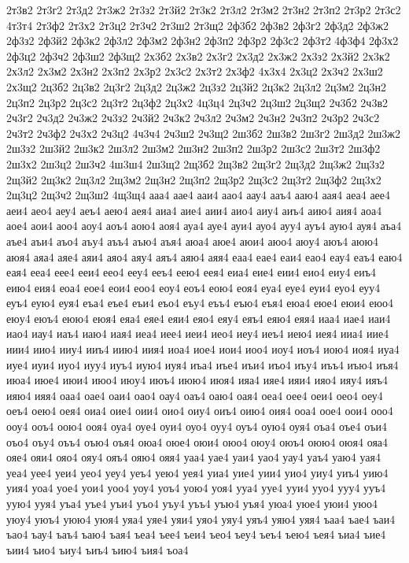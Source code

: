 {2т3в2
2т3г2
2т3д2
2т3ж2
2т3з2
2т3й2
2т3к2
2т3л2
2т3м2
2т3н2
2т3п2
2т3р2
2т3с2
4т3т4
2т3ф2
2т3х2
2т3ц2
2т3ч2
2т3ш2
2т3щ2
2ф3б2
2ф3в2
2ф3г2
2ф3д2
2ф3ж2
2ф3з2
2ф3й2
2ф3к2
2ф3л2
2ф3м2
2ф3н2
2ф3п2
2ф3р2
2ф3с2
2ф3т2
4ф3ф4
2ф3х2
2ф3ц2
2ф3ч2
2ф3ш2
2ф3щ2
2х3б2
2х3в2
2х3г2
2х3д2
2х3ж2
2х3з2
2х3й2
2х3к2
2х3л2
2х3м2
2х3н2
2х3п2
2х3р2
2х3с2
2х3т2
2х3ф2
4х3х4
2х3ц2
2х3ч2
2х3ш2
2х3щ2
2ц3б2
2ц3в2
2ц3г2
2ц3д2
2ц3ж2
2ц3з2
2ц3й2
2ц3к2
2ц3л2
2ц3м2
2ц3н2
2ц3п2
2ц3р2
2ц3с2
2ц3т2
2ц3ф2
2ц3х2
4ц3ц4
2ц3ч2
2ц3ш2
2ц3щ2
2ч3б2
2ч3в2
2ч3г2
2ч3д2
2ч3ж2
2ч3з2
2ч3й2
2ч3к2
2ч3л2
2ч3м2
2ч3н2
2ч3п2
2ч3р2
2ч3с2
2ч3т2
2ч3ф2
2ч3х2
2ч3ц2
4ч3ч4
2ч3ш2
2ч3щ2
2ш3б2
2ш3в2
2ш3г2
2ш3д2
2ш3ж2
2ш3з2
2ш3й2
2ш3к2
2ш3л2
2ш3м2
2ш3н2
2ш3п2
2ш3р2
2ш3с2
2ш3т2
2ш3ф2
2ш3х2
2ш3ц2
2ш3ч2
4ш3ш4
2ш3щ2
2щ3б2
2щ3в2
2щ3г2
2щ3д2
2щ3ж2
2щ3з2
2щ3й2
2щ3к2
2щ3л2
2щ3м2
2щ3н2
2щ3п2
2щ3р2
2щ3с2
2щ3т2
2щ3ф2
2щ3х2
2щ3ц2
2щ3ч2
2щ3ш2
4щ3щ4
ааа4
аае4
ааи4
аао4
аау4
ааъ4
ааю4
аая4
аеа4
аее4
аеи4
аео4
аеу4
аеъ4
аею4
аея4
аиа4
аие4
аии4
аио4
аиу4
аиъ4
аию4
аия4
аоа4
аое4
аои4
аоо4
аоу4
аоъ4
аою4
аоя4
ауа4
ауе4
ауи4
ауо4
ауу4
ауъ4
аую4
ауя4
аъа4
аъе4
аъи4
аъо4
аъу4
аъъ4
аъю4
аъя4
аюа4
аюе4
аюи4
аюо4
аюу4
аюъ4
аюю4
аюя4
аяа4
аяе4
аяи4
аяо4
аяу4
аяъ4
аяю4
аяя4
еаа4
еае4
еаи4
еао4
еау4
еаъ4
еаю4
еая4
ееа4
еее4
ееи4
еео4
ееу4
ееъ4
еею4
еея4
еиа4
еие4
еии4
еио4
еиу4
еиъ4
еию4
еия4
еоа4
еое4
еои4
еоо4
еоу4
еоъ4
еою4
еоя4
еуа4
еуе4
еуи4
еуо4
еуу4
еуъ4
еую4
еуя4
еъа4
еъе4
еъи4
еъо4
еъу4
еъъ4
еъю4
еъя4
еюа4
еюе4
еюи4
еюо4
еюу4
еюъ4
еюю4
еюя4
еяа4
еяе4
еяи4
еяо4
еяу4
еяъ4
еяю4
еяя4
иаа4
иае4
иаи4
иао4
иау4
иаъ4
иаю4
иая4
иеа4
иее4
иеи4
иео4
иеу4
иеъ4
иею4
иея4
ииа4
иие4
иии4
иио4
ииу4
ииъ4
иию4
иия4
иоа4
иое4
иои4
иоо4
иоу4
иоъ4
иою4
иоя4
иуа4
иуе4
иуи4
иуо4
иуу4
иуъ4
иую4
иуя4
иъа4
иъе4
иъи4
иъо4
иъу4
иъъ4
иъю4
иъя4
июа4
июе4
июи4
июо4
июу4
июъ4
июю4
июя4
ияа4
ияе4
ияи4
ияо4
ияу4
ияъ4
ияю4
ияя4
оаа4
оае4
оаи4
оао4
оау4
оаъ4
оаю4
оая4
оеа4
оее4
оеи4
оео4
оеу4
оеъ4
оею4
оея4
оиа4
оие4
оии4
оио4
оиу4
оиъ4
оию4
оия4
ооа4
оое4
оои4
ооо4
ооу4
ооъ4
оою4
ооя4
оуа4
оуе4
оуи4
оуо4
оуу4
оуъ4
оую4
оуя4
оъа4
оъе4
оъи4
оъо4
оъу4
оъъ4
оъю4
оъя4
оюа4
оюе4
оюи4
оюо4
оюу4
оюъ4
оюю4
оюя4
ояа4
ояе4
ояи4
ояо4
ояу4
ояъ4
ояю4
ояя4
уаа4
уае4
уаи4
уао4
уау4
уаъ4
уаю4
уая4
уеа4
уее4
уеи4
уео4
уеу4
уеъ4
уею4
уея4
уиа4
уие4
уии4
уио4
уиу4
уиъ4
уию4
уия4
уоа4
уое4
уои4
уоо4
уоу4
уоъ4
уою4
уоя4
ууа4
ууе4
ууи4
ууо4
ууу4
ууъ4
уую4
ууя4
уъа4
уъе4
уъи4
уъо4
уъу4
уъъ4
уъю4
уъя4
уюа4
уюе4
уюи4
уюо4
уюу4
уюъ4
уюю4
уюя4
уяа4
уяе4
уяи4
уяо4
уяу4
уяъ4
уяю4
уяя4
ъаа4
ъае4
ъаи4
ъао4
ъау4
ъаъ4
ъаю4
ъая4
ъеа4
ъее4
ъеи4
ъео4
ъеу4
ъеъ4
ъею4
ъея4
ъиа4
ъие4
ъии4
ъио4
ъиу4
ъиъ4
ъию4
ъия4
ъоа4
}
